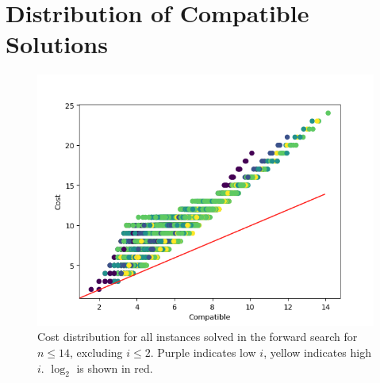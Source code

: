 \documentclass[a4paper,UKenglish,cleveref, autoref, thm-restate]{lipics-v2021}
\begin{document}
\section{Distribution of Compatible Solutions}

\begin{figure}[h]
  \includegraphics*[scale=0.5]{figures/compatible_cost_relation.png}
  \caption*{Cost distribution for all instances solved in the forward search for $n \leq 14$, excluding $i \leq 2$.
    Purple indicates low $i$, yellow indicates high $i$. $\log_2$ is shown in red.}
\end{figure}




\end{document}
